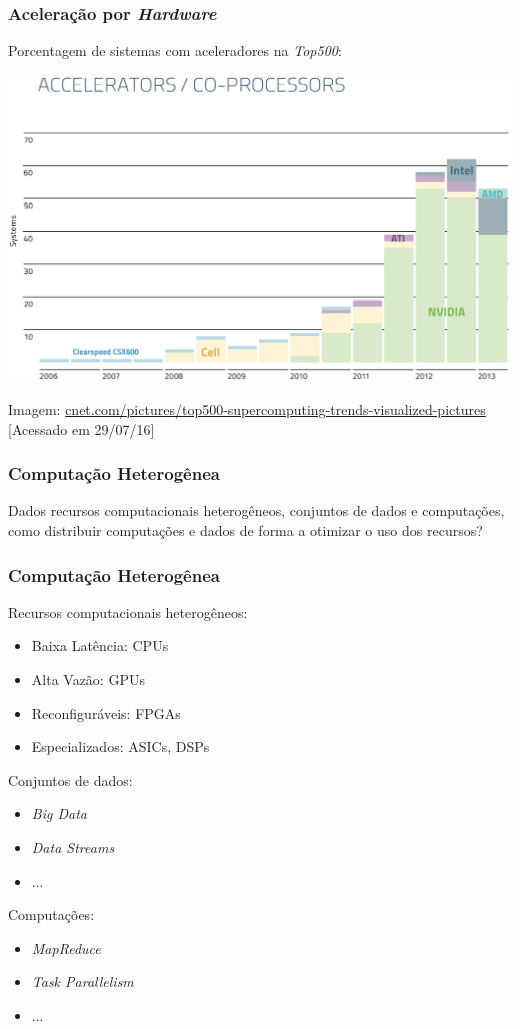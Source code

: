 \documentclass[10pt, compress]{beamer}
\begin{document}
\begin{frame}
    \frametitle{Aceleração por \textit{Hardware}}
    Porcentagem de sistemas com aceleradores na \textit{Top500}:

    \begin{center}
    \includegraphics[width=.85\textwidth]{top500_accel}
    \hfill

    \tiny{Imagem: \url{cnet.com/pictures/top500-supercomputing-trends-visualized-pictures} [Acessado em 29/07/16]}
    \end{center}
\end{frame}

\begin{frame}
    \frametitle{Computação Heterogênea}
    Dados recursos computacionais \alert{heterogêneos}, conjuntos de
    \alert{dados} e \alert{computações}, como distribuir computações e dados de
    forma a \alert{otimizar o uso} dos recursos?
\end{frame}

\begin{frame}
    \frametitle{Computação Heterogênea}
    Recursos computacionais \alert{heterogêneos}:
    \begin{itemize}
        \item Baixa Latência: CPUs
        \item Alta Vazão: GPUs
        \item Reconfiguráveis: FPGAs
        \item Especializados: ASICs, DSPs
    \end{itemize}
    \pause
    Conjuntos de \alert{dados}:
    \begin{itemize}
        \item \textit{Big Data}
        \item \textit{Data Streams}
        \item ...
    \end{itemize}
    \pause
    \alert{Computações}:
    \begin{itemize}
        \item \textit{MapReduce}
        \item \textit{Task Parallelism}
        \item ...
    \end{itemize}
\end{frame}
\end{document}
